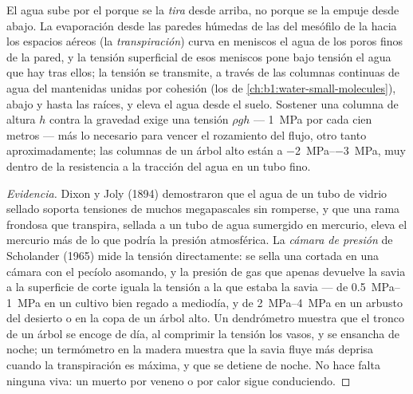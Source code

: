 \begin{theorem}\label{thm:b1:plant-transport:cohesiontension}
El agua sube por el  porque se la \emph{tira} desde arriba, no porque
se la empuje desde abajo. La evaporación desde las paredes húmedas de las
 del mesófilo de la  hacia los espacios aéreos (la
\emph{transpiración}) curva en meniscos el agua de los poros finos de la
pared, y la tensión superficial de esos meniscos pone bajo tensión el agua
que hay tras ellos; la tensión se transmite, a través de las columnas
continuas de agua del  mantenidas unidas por cohesión (los  de \cref{ch:b1:water-small-molecules}),  abajo y hasta las
raíces, y eleva el agua desde el suelo. Sostener una columna de altura $h$
contra la gravedad exige una tensión $\rho g h$ --- \qty{1}{MPa} por cada
cien metros --- más lo necesario para vencer el rozamiento del flujo, otro
tanto aproximadamente; las columnas de un árbol alto están a
\qtyrange{-2}{-3}{MPa}, muy dentro de la resistencia a la tracción del agua
en un tubo fino.
\end{theorem}
\begin{proof}[Evidencia]
Dixon y Joly (1894) demostraron que el agua de un tubo de vidrio sellado
soporta tensiones de muchos megapascales sin romperse, y que una rama
frondosa que transpira, sellada a un tubo de agua sumergido en mercurio,
eleva el mercurio más de lo que podría la presión atmosférica. La
\emph{cámara de presión} de Scholander (1965) mide la tensión directamente:
se sella una  cortada en una cámara con el pecíolo asomando, y la
presión de gas que apenas devuelve la savia a la superficie de corte iguala
la tensión a la que estaba la savia --- de \qtyrange{0.5}{1}{MPa} en un
cultivo bien regado a mediodía, y de \qtyrange{2}{4}{MPa} en un arbusto del
desierto o en la copa de un árbol alto. Un dendrómetro muestra que el tronco
de un árbol se encoge de día, al comprimir la tensión los vasos, y se
ensancha de noche; un termómetro en la madera muestra que la savia fluye más
deprisa cuando la transpiración es máxima, y que se detiene de noche. No
hace falta ninguna  viva: un  muerto por veneno o por calor sigue
conduciendo.
\end{proof}

